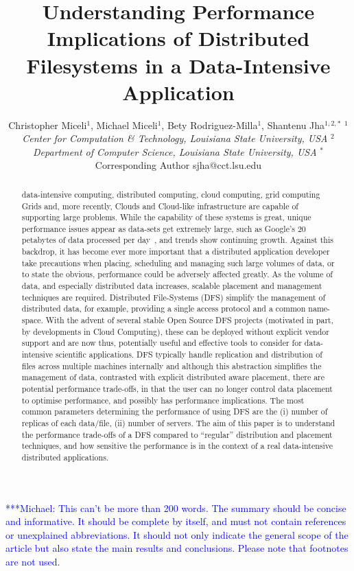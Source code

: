 \documentclass{rspublic}
\title[Understanding Performance Implications of Distributed Filesystems
in a Data-Intensive Application]{Understanding Performance Implications
of Distributed Filesystems in a Data-Intensive Application}
\author[Miceli, Miceli, Rodriguez-Milla, Jha]{
 Christopher Miceli$^{1}$, Michael Miceli$^{1}$, Bety Rodriguez-Milla$^{1}$, Shantenu Jha$^{1,2,*}$
 \small{\emph{$^{1}$Center for Computation \& Technology, Louisiana State University, USA}}
 \small{\emph{$^{2}$Department of Computer Science, Louisiana State University, USA}}
 {\footnotesize {\hspace{0.0 in} $^*$Corresponding Author sjha@cct.lsu.edu}}
}
\newcommand{\micnote}[1]{ {\textcolor{blue} { ***Michael: #1 }}}
\newcommand{\micnote}[1]{}
\begin{document}
\maketitle

\micnote{This can't be more than 200 words. The summary should be
concise and informative. It should be complete by itself, and must not
contain references or unexplained abbreviations. It should not only
indicate the general scope of the article but also state the main
results and conclusions. Please note that footnotes are not used.}

\begin{abstract}{data-intensive computing, distributed computing, cloud
computing, grid computing} Grids and, more recently, Clouds and
Cloud-like infrastructure are capable of supporting large problems.
While the capability of these systems is great, unique performance
issues appear as data-sets get extremely large, such as Google's 20
petabytes of data processed per day~\citep{google}, and trends show
continuing growth. Against this backdrop, it has become ever more
important that a distributed application developer take precautions when
placing, scheduling and managing such large volumes of data, or to state
the obvious, performance could be adversely affected greatly. As the
volume of data, and especially distributed data increases, scalable
placement and management techniques are required.  Distributed
File-Systems (DFS) simplify the management of distributed data, for
example, providing a single access protocol and a common name-space.
With the advent of several stable Open Source DFS projects (motivated in
part, by developments in Cloud Computing), these can be deployed without
explicit vendor support and are now thus, potentially useful and
effective tools to consider for data-intensive scientific applications.
DFS typically handle replication and distribution of files across
multiple machines internally and although this abstraction simplifies
the management of data, contrasted with explicit distributed aware
placement, there are potential performance trade-offs, in that the user
can no longer control data placement to optimise performance, and
possibly has performance implications.  The most common parameters
determining the performance of using DFS are the (i) number of replicas
of each data/file, (ii) number of servers. The aim of this paper is to
understand the performance trade-offs of a DFS compared to ``regular''
distribution and placement techniques, and how sensitive the performance
is in the context of a real data-intensive distributed applications.\end{abstract}
\end{document}
